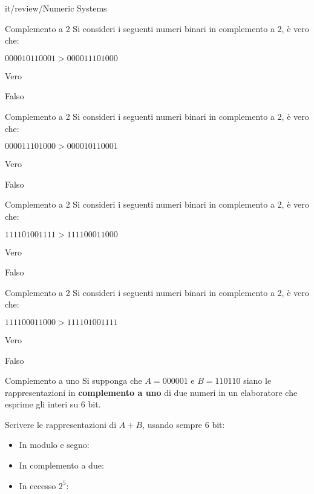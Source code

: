 \documentclass[11pt]{article}
\begin{document}
\begin{quiz}{it/review/Numeric Systems}
\begin{multi}[points=1]{Complemento a 2}
Si consideri i seguenti numeri binari in complemento a 2, \`{e} vero che:

$000010110001 > 000011101000$

\item Vero
\item* Falso
\end{multi}


\begin{multi}[points=1]{Complemento a 2}
Si consideri i seguenti numeri binari in complemento a 2, \`{e} vero che:

$000011101000 > 000010110001$

\item* Vero
\item Falso
\end{multi}


\begin{multi}[points=1]{Complemento a 2}
Si consideri i seguenti numeri binari in complemento a 2, \`{e} vero che:

$111101001111 > 111100011000$

\item* Vero
\item Falso
\end{multi}


\begin{multi}[points=1]{Complemento a 2}
Si consideri i seguenti numeri binari in complemento a 2, \`{e} vero che:

$111100011000 > 111101001111$

\item Vero
\item* Falso
\end{multi}


\begin{cloze}[points=1,shuffle=false]{Complemento a uno}
Si supponga che $A = 000001$ e $B = 110110$ siano le rappresentazioni in \textbf{complemento a uno} di due numeri in un elaboratore che esprime gli interi su 6 bit.

Scrivere le rappresentazioni di $A+B$, usando sempre 6 bit:

\begin{itemize}
\item In modulo e segno: 
\item In complemento a due: 
\item In eccesso $2^5$: 
\end{itemize}
\end{cloze}


\end{quiz}
\end{document}
